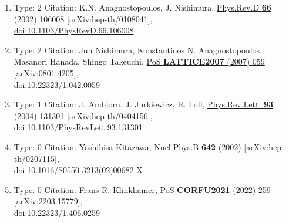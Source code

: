 \documentclass[a4paper,10pt]{article}
\begin{document}
\begin{enumerate}
\begin{enumerate}
  \item Type: 2 Citation: K.N. Anagnostopoulos, J. Nishimura, \href{https://www.doi.org/10.1103/PhysRevD.66.106008}{Phys.Rev.D {\bf 66} (2002) 106008}  \href{https://arxiv.org/abs/hep-th/0108041}{[arXiv:hep-th/0108041]},\\\href{https://www.doi.org/10.1103/PhysRevD.66.106008}{doi:10.1103/PhysRevD.66.106008}
  \item Type: 2 Citation: Jun Nishimura, Konstantinos N. Anagnostopoulos, Masanori Hanada, Shingo Takeuchi, \href{https://www.doi.org/10.22323/1.042.0059}{PoS {\bf LATTICE2007} (2007) 059}  \href{https://arxiv.org/abs/0801.4205}{[arXiv:0801.4205]},\\\href{https://www.doi.org/10.22323/1.042.0059}{doi:10.22323/1.042.0059}
  \item Type: 1 Citation: J. Ambjorn, J. Jurkiewicz, R. Loll, \href{https://www.doi.org/10.1103/PhysRevLett.93.131301}{Phys.Rev.Lett. {\bf 93} (2004) 131301}  \href{https://arxiv.org/abs/hep-th/0404156}{[arXiv:hep-th/0404156]},\\\href{https://www.doi.org/10.1103/PhysRevLett.93.131301}{doi:10.1103/PhysRevLett.93.131301}
  \item Type: 0 Citation: Yoshihisa Kitazawa, \href{https://www.doi.org/10.1016/S0550-3213(02)00682-X}{Nucl.Phys.B {\bf 642} (2002) }  \href{https://arxiv.org/abs/hep-th/0207115}{[arXiv:hep-th/0207115]},\\\href{https://www.doi.org/10.1016/S0550-3213(02)00682-X}{doi:10.1016/S0550-3213(02)00682-X}
  \item Type: 0 Citation: Frans R. Klinkhamer, \href{https://www.doi.org/10.22323/1.406.0259}{PoS {\bf CORFU2021} (2022) 259}  \href{https://arxiv.org/abs/2203.15779}{[arXiv:2203.15779]},\\\href{https://www.doi.org/10.22323/1.406.0259}{doi:10.22323/1.406.0259}

\end{enumerate}
\end{enumerate}
\end{document}
